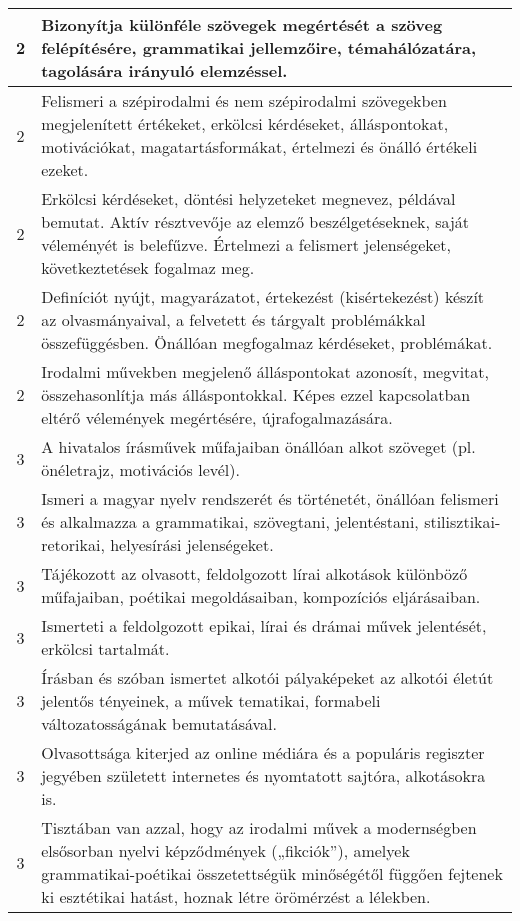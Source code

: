 \begin{longtable}{c | p{12cm} }
                                
                                          2 &  Bizonyítja különféle szövegek megértését a szöveg felépítésére, grammatikai jellemzőire, témahálózatára, tagolására irányuló elemzéssel. \\ \hline
                                          2 &  Felismeri a szépirodalmi és nem szépirodalmi szövegekben megjelenített értékeket, erkölcsi kérdéseket, álláspontokat, motivációkat, magatartásformákat, értelmezi és önálló értékeli ezeket. \\ \hline
                                          2 &  Erkölcsi kérdéseket, döntési helyzeteket megnevez, példával bemutat. Aktív résztvevője az elemző beszélgetéseknek, saját véleményét is belefűzve. Értelmezi a felismert jelenségeket, következtetések fogalmaz meg. \\ \hline
                                          2 &  Definíciót nyújt, magyarázatot, értekezést (kisértekezést) készít az olvasmányaival, a felvetett  és tárgyalt problémákkal összefüggésben. Önállóan megfogalmaz kérdéseket, problémákat. \\ \hline
                                          2 &  Irodalmi művekben megjelenő álláspontokat azonosít, megvitat, összehasonlítja más álláspontokkal. Képes ezzel kapcsolatban eltérő vélemények megértésére, újrafogalmazására. \\ \hline
                                      
                                
                                          3 &  A hivatalos írásművek műfajaiban önállóan alkot szöveget (pl. önéletrajz, motivációs levél). \\ \hline
                                          3 &  Ismeri a magyar nyelv rendszerét és történetét, önállóan felismeri és alkalmazza a grammatikai, szövegtani, jelentéstani, stilisztikai-retorikai, helyesírási jelenségeket. \\ \hline
                                          3 &  Tájékozott az olvasott, feldolgozott lírai alkotások különböző műfajaiban, poétikai megoldásaiban, kompozíciós eljárásaiban. \\ \hline
                                          3 &  Ismerteti a feldolgozott epikai, lírai és drámai művek jelentését, erkölcsi tartalmát. \\ \hline
                                          3 &  Írásban és szóban ismertet alkotói pályaképeket az alkotói életút jelentős tényeinek, a művek tematikai, formabeli változatosságának bemutatásával. \\ \hline
                                          3 &  Olvasottsága kiterjed az online médiára és a populáris regiszter jegyében született internetes és nyomtatott sajtóra, alkotásokra is. \\ \hline
                                          3 &  Tisztában van azzal, hogy az irodalmi művek a modernségben elsősorban nyelvi képződmények („fikciók”), amelyek grammatikai-poétikai összetettségük minőségétől függően fejtenek ki esztétikai hatást, hoznak létre örömérzést a lélekben. \\ \hline
                                      

\end{longtable}
